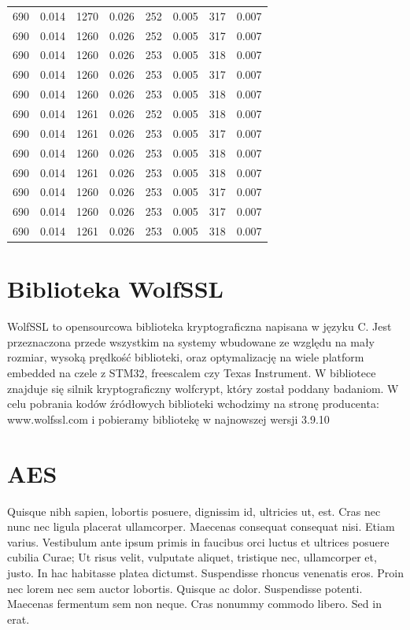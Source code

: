 \documentclass[oneside]{mgr}
\begin{document}
\begin{center}
\begin{tabular}{|c|c|c|c|c|c|c|c|}
690 &	0.014 &	1270 &	0.026 &	252 &	0.005 &	317 &	0.007 \\
690 &	0.014 &	1260 &	0.026 &	252 &	0.005 &	317 &	0.007 \\
690 &	0.014 &	1260 &	0.026 &	253 &	0.005 &	318 &	0.007 \\
690 &	0.014 &	1260 &	0.026 &	253 &	0.005 &	317 &	0.007 \\
690 &	0.014 &	1260 &	0.026 &	253 &	0.005 &	318 &	0.007 \\
690 &	0.014 &	1261 &	0.026 &	252 &	0.005 &	318 &	0.007 \\
690 &	0.014 &	1261 &	0.026 &	253 &	0.005 &	317 &	0.007 \\
690 &	0.014 &	1260 &	0.026 &	253 &	0.005 &	318 &	0.007 \\
690 &	0.014 &	1261 &	0.026 &	253 &	0.005 &	318 &	0.007 \\
690 &	0.014 &	1260 &	0.026 &	253 &	0.005 &	317 &	0.007 \\
690 &	0.014 &	1260 &	0.026 &	253 &	0.005 &	317 &	0.007 \\
690 &	0.014 &	1261 &	0.026 &	253 &	0.005 &	318 &	0.007 \\

\hline 
\end{tabular} 

\end{center}
\chapter{Biblioteka WolfSSL}
WolfSSL to opensourcowa biblioteka kryptograficzna napisana w języku C. Jest przeznaczona przede wszystkim na systemy wbudowane ze względu na mały rozmiar, wysoką prędkość biblioteki, oraz optymalizację na wiele platform embedded na czele z STM32, freescalem czy Texas Instrument. W bibliotece znajduje się silnik kryptograficzny wolfcrypt, który został poddany badaniom. W celu pobrania kodów źródłowych biblioteki wchodzimy na stronę producenta: www.wolfssl.com i pobieramy bibliotekę w najnowszej wersji 3.9.10

\chapter{AES}
Quisque nibh sapien, lobortis posuere, dignissim id, ultricies ut,
est. Cras nec nunc nec ligula placerat ullamcorper. Maecenas consequat
consequat nisi. Etiam varius. Vestibulum ante ipsum primis in faucibus
orci luctus et ultrices posuere cubilia Curae; Ut risus velit,
vulputate aliquet, tristique nec, ullamcorper et, justo. In hac
habitasse platea dictumst. Suspendisse rhoncus venenatis eros. Proin
nec lorem nec sem auctor lobortis. Quisque ac dolor. Suspendisse
potenti. Maecenas fermentum sem non neque. Cras nonummy commodo
libero. Sed in erat.
\end{document}
